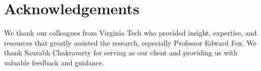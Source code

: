 
\section{Acknowledgements}

We thank our colleagues from Virginia Tech who provided insight, expertise, and resources that greatly assisted the research, especially Professor Edward Fox.
We thank Saurabh Chakravarty for serving as our client and providing us with valuable feedback and guidance.


